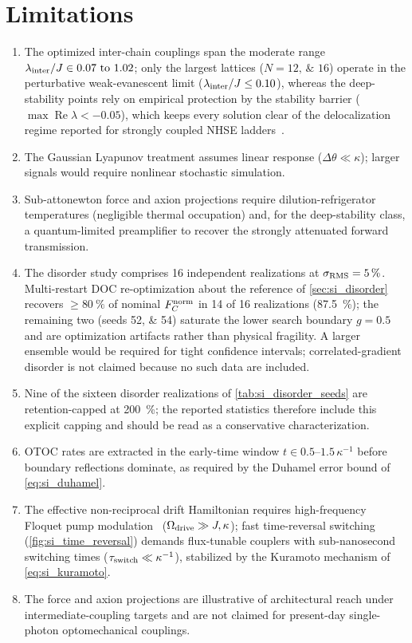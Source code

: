 \documentclass[aps,prxquantum,preprint,superscriptaddress,amsmath,amssymb]{revtex4-2}
\newcommand{\Real}{\operatorname{Re}}
\newcommand{\Fnorm}{F_C^{\rm norm}}
\newcommand{\lint}{\lambda_{\rm inter}}
\begin{document}
\section{Limitations}
\label{sec:si_limitations}

\begin{enumerate}
\item The optimized inter-chain couplings span the moderate range $\lint/J\in\numrange{0.07}{1.02}$; only the largest lattices ($N=\numlist{12;16}$) operate in the perturbative weak-evanescent limit ($\lint/J\le\num{0.10}$), whereas the deep-stability points rely on empirical protection by the stability barrier ($\max\Real\lambda<\num{-0.05}$), which keeps every solution clear of the delocalization regime reported for strongly coupled NHSE ladders~\citep{Wang2025}.
\item The Gaussian Lyapunov treatment assumes linear response ($\Delta\theta\ll\kappa$); larger signals would require nonlinear stochastic simulation.
\item Sub-attonewton force and axion projections require dilution-refrigerator temperatures (negligible thermal occupation) and, for the deep-stability class, a quantum-limited preamplifier to recover the strongly attenuated forward transmission.
\item The disorder study comprises 16 independent realizations at $\sigma_{\rm RMS}=\qty{5}{\percent}$. Multi-restart DOC re-optimization about the reference of \cref{sec:si_disorder} recovers $\ge\qty{80}{\percent}$ of nominal $\Fnorm$ in 14 of 16 realizations (\qty{87.5}{\percent}); the remaining two (seeds \numlist{52;54}) saturate the lower search boundary $g=\num{0.5}$ and are optimization artifacts rather than physical fragility. A larger ensemble would be required for tight confidence intervals; correlated-gradient disorder is not claimed because no such data are included.
\item Nine of the sixteen disorder realizations of \cref{tab:si_disorder_seeds} are retention-capped at \qty{200}{\percent}; the reported statistics therefore include this explicit capping and should be read as a conservative characterization.
\item OTOC rates are extracted in the early-time window $t\in\numrange{0.5}{1.5}\,\kappa^{-1}$ before boundary reflections dominate, as required by the Duhamel error bound of \cref{eq:si_duhamel}.
\item The effective non-reciprocal drift Hamiltonian requires high-frequency Floquet pump modulation~\citep{Asano_2025} ($\Omega_{\rm drive}\gg J,\kappa$); fast time-reversal switching (\cref{fig:si_time_reversal}) demands flux-tunable couplers with sub-nanosecond switching times ($\tau_{\rm switch}\ll\kappa^{-1}$), stabilized by the Kuramoto mechanism of \cref{eq:si_kuramoto}.
\item The force and axion projections are illustrative of architectural reach under intermediate-coupling targets and are not claimed for present-day single-photon optomechanical couplings.
\end{enumerate}
\end{document}
